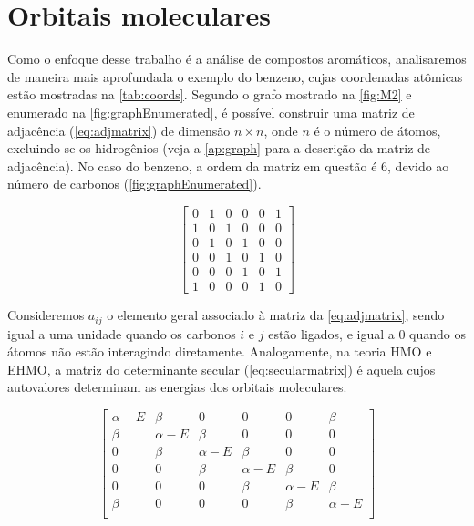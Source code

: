 \newpage
\section{Orbitais moleculares}\label{sec:benzene}

Como o enfoque desse trabalho é a análise de compostos aromáticos, analisaremos de maneira mais aprofundada o exemplo do benzeno, cujas coordenadas atômicas estão mostradas na \autoref{tab:coords}. Segundo o grafo mostrado na \autoref{fig:M2} e enumerado na \autoref{fig:graphEnumerated}, é possível construir uma matriz de adjacência (\autoref{eq:adjmatrix}) de dimensão $n \times n$, onde $n$ é o número de átomos, excluindo-se os hidrogênios (veja a \autoref{ap:graph} para a descrição da matriz de adjacência). No caso do benzeno, a ordem da matriz em questão é 6, devido ao número de carbonos (\autoref{fig:graphEnumerated}).

\begin{figure}[htb]
\vspace{0.8\baselineskip}
\begin{equation}
\label{eq:adjmatrix}
\begin{bmatrix}
    0 & 1 & 0 & 0 & 0 & 1 \\
    1 & 0 & 1 & 0 & 0 & 0 \\
    0 & 1 & 0 & 1 & 0 & 0 \\
    0 & 0 & 1 & 0 & 1 & 0 \\
    0 & 0 & 0 & 1 & 0 & 1 \\
    1 & 0 & 0 & 0 & 1 & 0
\end{bmatrix}
\end{equation}
\end{figure}

\newpage

 Consideremos $a_{ij}$ o elemento geral associado à matriz da \autoref{eq:adjmatrix}, sendo igual a uma unidade quando os carbonos $i$ e $j$ estão ligados, e igual a $0$ quando os átomos não estão interagindo diretamente. Analogamente, na teoria \gls{HMO} e \gls{EHMO}, a matriz do determinante secular (\autoref{eq:secularmatrix}) é aquela cujos autovalores determinam as energias dos orbitais moleculares.

\begin{figure}[htb]
\vspace{0.8\baselineskip}
\begin{equation}
\label{eq:secularmatrix}
\begin{bmatrix}
    \alpha - E & \beta & 0 & 0 & 0 & \beta \\
    \beta & \alpha - E & \beta & 0 & 0 & 0 \\
    0 & \beta & \alpha - E & \beta & 0 & 0 \\
    0 & 0 & \beta & \alpha - E & \beta & 0 \\
    0 & 0 & 0 & \beta & \alpha - E & \beta \\
    \beta & 0 & 0 & 0 & \beta & \alpha - E \\
\end{bmatrix}
\end{equation}
\end{figure}

